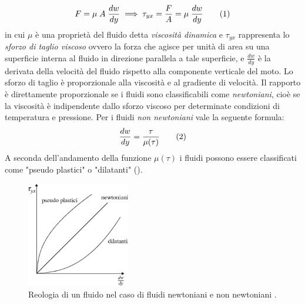 \[F= \mu \; A \; \frac{dw}{dy} \implies \tau_{yx} = \frac{F}{A} = \mu \; \frac{dw}{dy} \addtag \label{eq:newton} \]
in cui \(\mu\) è una proprietà del fluido detta \textit{viscosità dinamica} e \(\tau_{yx}\) rappresenta lo \textit{sforzo di taglio viscoso} ovvero la forza che agisce per unità di area su  una superficie interna al fluido in direzione parallela a tale superficie, e \(\frac{dw}{dy}\) è la derivata della velocità del fluido rispetto alla componente verticale del moto. Lo sforzo di taglio è proporzionale alla viscosità e al gradiente di velocità. Il rapporto è direttamente proporzionale se i fluidi sono classificabili come \textit{newtoniani}, cioè se la viscosità è indipendente dallo sforzo viscoso per determinate condizioni di temperatura e pressione. Per i fluidi \textit{non newtoniani} vale la seguente formula:
\[\frac{dw}{dy}=\frac{\tau}{\mu(\tau)}\addtag\label{eq:newtoniani}\]
A seconda dell'andamento della funzione \(\mu(\tau)\) i fluidi possono essere classificati come "pseudo plastici" o "dilatanti" ().
\begin{figure}[!htbp] %
    \centering
    \includegraphics[width=0.40\textwidth]{fig/fluidodinamica/newtoniani.eps}
    \caption{Reologia di un fluido nel caso di fluidi newtoniani e non newtoniani \parencite{guglielmini2004lezioni}.} 
    \label{fig:newtoniani}
\end{figure}
